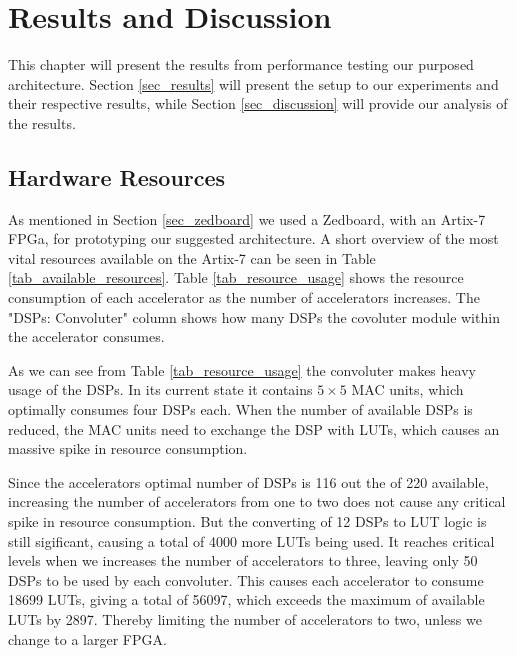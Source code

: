 \chapter{Results and Discussion} \label{chap_results}

This chapter will present the results from performance testing our purposed architecture. Section \ref{sec_results} will present the setup to our experiments and their respective results, while Section \ref{sec_discussion} will provide our analysis of the results. 


\section{Hardware Resources}

As mentioned in Section \ref{sec_zedboard} we used a Zedboard, with an Artix-7 FPGa, for prototyping our suggested architecture. A short overview of the most vital resources available on the Artix-7 can be seen in Table \ref{tab_available_resources}. Table \ref{tab_resource_usage} shows the resource consumption of each accelerator as the number of accelerators increases. The "DSPs: Convoluter" column shows how many DSPs the covoluter module within the accelerator consumes.

As we can see from Table \ref{tab_resource_usage} the convoluter makes heavy usage of the DSPs. In its current state it contains $ 5 \times 5 $ MAC units, which optimally consumes four DSPs each. When the number of available DSPs is reduced, the MAC units need to exchange the DSP with LUTs, which causes an massive spike in resource consumption.

Since the accelerators optimal number of DSPs is 116 out the of 220 available, increasing the number of accelerators from one to two does not cause any critical spike in resource consumption. But the converting of 12 DSPs to LUT logic is still sigificant, causing a total of 4000 more LUTs being used. It reaches critical levels when we increases the number of accelerators to three, leaving only 50 DSPs to be used by each convoluter. This causes each accelerator to consume 18699 LUTs, giving a total of 56097, which exceeds the maximum of available LUTs by 2897. Thereby limiting the number of accelerators to two, unless we change to a larger FPGA.

